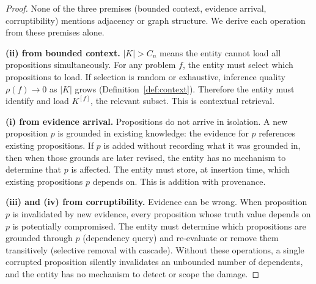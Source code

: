 \documentclass[11pt]{article}
\theoremstyle{definition}
\begin{document}
\begin{proof}
None of the three premises (bounded context, evidence arrival,
corruptibility) mentions adjacency or graph structure. We derive each
operation from these premises alone.

\textbf{(ii) from bounded context.} $|K| > C_n$ means the entity cannot
load all propositions simultaneously. For any problem $f$, the entity
must select which propositions to load. If selection is random or
exhaustive, inference quality $\rho(f) \to 0$ as $|K|$ grows
(Definition~\ref{def:context}). Therefore the entity must identify and
load $K^{[f]}$, the relevant subset. This is contextual retrieval.

\textbf{(i) from evidence arrival.} Propositions do not arrive in
isolation. A new proposition $p$ is grounded in existing knowledge: the
evidence for $p$ references existing propositions. If $p$ is added
without recording what it was grounded in, then when those grounds are
later revised, the entity has no mechanism to determine that $p$ is
affected. The entity must store, at insertion time, which existing
propositions $p$ depends on. This is addition with provenance.

\textbf{(iii) and (iv) from corruptibility.} Evidence can be wrong.
When proposition $p$ is invalidated by new evidence, every proposition
whose truth value depends on $p$ is potentially compromised. The entity
must determine which propositions are grounded through $p$
(dependency query) and re-evaluate or remove them transitively
(selective removal with cascade). Without these operations, a single
corrupted proposition silently invalidates an unbounded number of
dependents, and the entity has no mechanism to detect or scope the
damage.
\end{proof}
\end{document}
